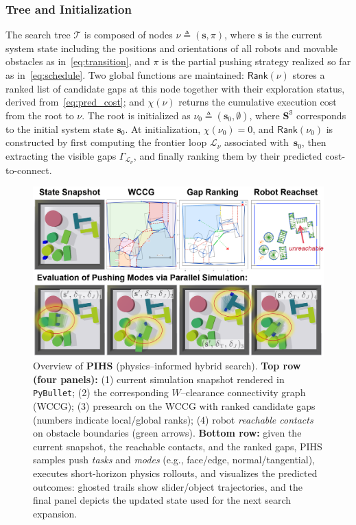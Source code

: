 \subsubsection{Tree and Initialization}
The search tree $\mathcal{T}$ is composed of nodes
$\nu\triangleq(\mathbf{s},\pi)$, where $\mathbf{s}$ is the current system
state including the positions and orientations of all robots and movable
obstacles as in~\eqref{eq:transition}, and $\pi$ is the partial pushing
strategy realized so far as in~\eqref{eq:schedule}. Two global functions are
maintained: $\mathsf{Rank}(\nu)$ stores a ranked list of candidate gaps at this
node together with their exploration status, derived from~\eqref{eq:pred_cost};
and $\chi(\nu)$ returns the cumulative execution cost
from the root to $\nu$.
The root is initialized as
$\nu_0\triangleq(\mathbf{s}_0,\emptyset)$, where
$\mathbf{S}^{\texttt{S}}$ corresponds to the initial system state
$\mathbf{s}_0$. At initialization, $\chi(\nu_0)=0$, and
$\mathsf{Rank}(\nu_0)$ is constructed by first computing the frontier loop
$\mathcal{L}_\nu$ associated with~$\mathbf{s}_0$, then extracting the visible
gaps $\Gamma_{\mathcal{L}_\nu}$, and finally ranking them by their predicted
cost-to-connect.
\begin{figure}[t!]
  \centering
  \includegraphics[width=0.95\linewidth]{figures/PIHS.png}
  \vspace{-0.15in}
  \caption{
  Overview of \textbf{PIHS} (physics–informed hybrid search). 
  \textbf{Top row (four panels):} (1) current simulation snapshot rendered in \texttt{PyBullet}; 
  (2) the corresponding $W$--clearance connectivity graph (WCCG); 
  (3) presearch on the WCCG with ranked candidate gaps (numbers indicate local/global ranks); 
  (4) robot \emph{reachable contacts} on obstacle boundaries (green arrows).
  \textbf{Bottom row:} given the current snapshot, the reachable contacts, and the ranked gaps, 
  PIHS samples push \emph{tasks} and \emph{modes} (e.g., face/edge, normal/tangential), 
  executes short-horizon physics rollouts, and visualizes the predicted outcomes: 
  ghosted trails show slider/object trajectories, and the final panel depicts the updated state used for the next search expansion.}
    \label{fig:PIHS}
   \vspace{-4mm}
\end{figure}
